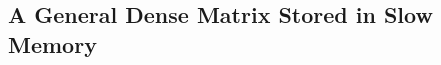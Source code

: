 \documentclass[12pt]{article}
\begin{document}




\subsection{A General Dense Matrix Stored in Slow Memory}
\end{document}
